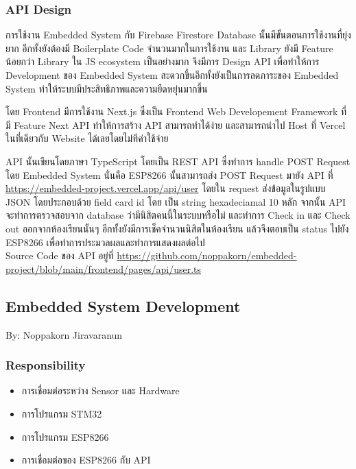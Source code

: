 \documentclass[fontsize=14pt]{extarticle}
\begin{document}
\subsubsection{API Design}
\par การใช้งาน Embedded System กับ Firebase Firestore Database นั้นมีขั้นตอนการใช้งานที่ยุ่งยาก อีกทั้งยังต้องมี Boilerplate Code จำนวนมากในการใช้งาน และ Library ยังมี Feature  น้อยกว่า Library ใน JS ecosystem เป็นอย่างมาก จึงมีการ Design API เพื่อทำให้การ Development ของ Embedded System สะดวกขึ้นอีกทั้งยังเป็นการลดภาระของ Embedded System ทำให้ระบบมีประสิทธิภาพและความยืดหยุ่นมากขึ้น
\par โดย Frontend มีการใช้งาน Next.js ซึ่งเป็น Frontend Web Developement Framework ที่มี Feature Next API ทำให้การสร้าง API สามารถทำได้ง่าย และสามารถนำไป Host ที่ Vercel ในที่เดียวกับ Website ได้เลยโดยไม่ทีค่าใช้จ่าย
\par API นั้นเขียนโดยภาษา TypeScript โดยเป็น REST API ซึ่งทำการ handle POST Request โดย Embedded System นั่นคือ ESP8266 นั้นสามารถส่ง POST Request มายัง API ที่ \url{https://embedded-project.vercel.app/api/user} โดยใน request ส่งข้อมูลในรูปแบบ JSON โดยประกอบด้วย field card id โดย เป็น string hexadeciamal 10 หลัก จากนั้น API จะทำการตรวจสอบจาก database ว่ามีนิสิตคนนี้ในระบบหรือไม่ และทำการ Check in และ Check out ออกจากห้องเรียนนั้นๆ อีกทั้งยังมีการเช็คจำนวนนิสิตในห้องเรียน แล้วจึงตอบเป็น status ไปยัง ESP8266 เพื่อทำการประมวลผลและทำการแสดงผลต่อไป\\
Source Code ของ API อยู่ที่ \url{https://github.com/noppakorn/embedded-project/blob/main/frontend/pages/api/user.ts}
\pagebreak
\subsection{Embedded System Development}
By: Noppakorn Jiravaranun\\
\subsubsection{Responsibility}
\begin{itemize}
    \item การเชื่อมต่อระหว่าง Sensor และ Hardware
    \item การโปรแกรม STM32
    \item การโปรแกรม ESP8266
    \item การเชื่อมต่อของ ESP8266 กับ API
\end{itemize}
\end{document}
